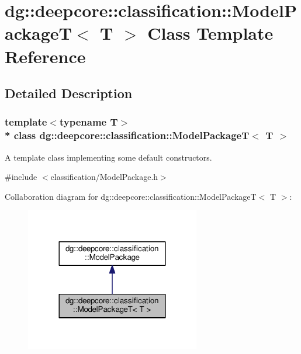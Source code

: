 \hypertarget{classdg_1_1deepcore_1_1classification_1_1_model_package_t}{}\section{dg\+:\+:deepcore\+:\+:classification\+:\+:Model\+PackageT$<$ T $>$ Class Template Reference}
\label{classdg_1_1deepcore_1_1classification_1_1_model_package_t}


\subsection{Detailed Description}
\subsubsection*{template$<$typename T$>$\\*
class dg\+::deepcore\+::classification\+::\+Model\+Package\+T$<$ T $>$}

A template class implementing some default constructors. 

{\ttfamily \#include $<$classification/\+Model\+Package.\+h$>$}



Collaboration diagram for dg\+:\+:deepcore\+:\+:classification\+:\+:Model\+PackageT$<$ T $>$\+:
\nopagebreak
\begin{figure}[H]
\begin{center}
\leavevmode
\includegraphics[width=216pt]{classdg_1_1deepcore_1_1classification_1_1_model_package_t__coll__graph}
\end{center}
\end{figure}
